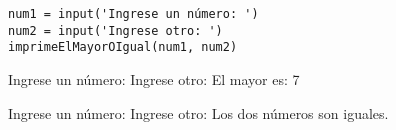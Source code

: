 \bgncolumns
{}
\vspace{-1ex}


\begin{lstlisting}
num1 = input('Ingrese un número: ')
num2 = input('Ingrese otro: ')
imprimeElMayorOIgual(num1, num2)
\end{lstlisting}

\vspace{-1ex}


\begin{exampleConsole}
Ingrese un número: 
Ingrese otro: 
El mayor es: 7
\end{exampleConsole}

\fullrule


\begin{exampleConsole}
Ingrese un número: 
Ingrese otro: 
Los dos números son iguales.
\end{exampleConsole}

\trmcolumns
